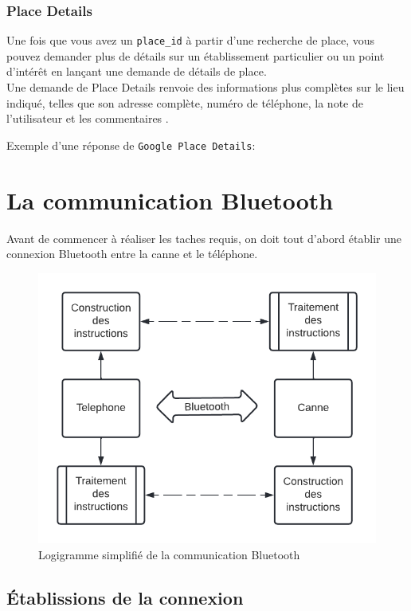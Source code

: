 \subsubsection{Place Details}
\label{place-details}

Une fois que vous avez un \verb|place_id| à partir d’une recherche de place, vous pouvez demander plus de détails sur un établissement particulier ou un point d’intérêt en lançant une demande de détails de place. \\
Une demande de Place Details renvoie des informations plus complètes sur le lieu indiqué, telles que son adresse complète, numéro de téléphone, la note de l’utilisateur et les commentaires \cite{google-place-details}.

Exemple d'une réponse de \verb|Google Place Details|:



\section{La communication Bluetooth}

Avant de commencer à réaliser les taches requis, on doit tout d'abord établir une connexion Bluetooth entre la canne et le téléphone.

\begin{figure}[!htbp]
    \centering
    \includegraphics[width=.7\linewidth]{assets/bluetooth/logigramme generale simplifie.png}
    \caption{Logigramme simplifié de la communication Bluetooth}
\end{figure}

\FloatBarrier

\subsection{Établissions de la connexion}


